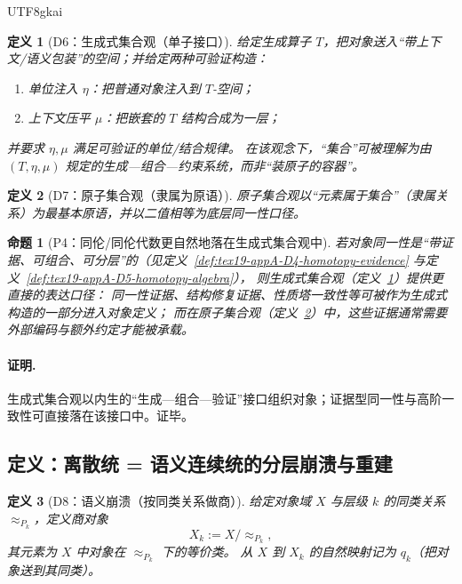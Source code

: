 \documentclass[12pt]{article}
\newtheorem{definition}{定义}[section]
\newtheorem{proposition}{命题}[section]
\begin{document}
\begin{CJK*}{UTF8}{gkai}
\begin{definition}[D6：生成式集合观（单子接口）]
\label{def:tex19-appA-D6-monad}
给定生成算子 $T$，把对象送入“带上下文/语义包装”的空间；并给定两种可验证构造：
\begin{enumerate}
  \item 单位注入 $\eta$：把普通对象注入到 $T$-空间；
  \item 上下文压平 $\mu$：把嵌套的 $T$ 结构合成为一层；
\end{enumerate}
并要求 $\eta,\mu$ 满足可验证的单位/结合规律。
在该观念下，“集合”可被理解为由 $(T,\eta,\mu)$ 规定的生成—组合—约束系统，而非“装原子的容器”。
\end{definition}

\begin{definition}[D7：原子集合观（隶属为原语）]
\label{def:tex19-appA-D7-atomic-set-view}
原子集合观以“元素属于集合”（隶属关系）为最基本原语，并以二值相等为底层同一性口径。
\end{definition}

\begin{proposition}[P4：同伦/同伦代数更自然地落在生成式集合观中]
\label{prop:tex19-appA-P4-homotopy-prefers-monad}
若对象同一性是“带证据、可组合、可分层”的（见定义~\ref{def:tex19-appA-D4-homotopy-evidence} 与定义~\ref{def:tex19-appA-D5-homotopy-algebra}），
则生成式集合观（定义~\ref{def:tex19-appA-D6-monad}）提供更直接的表达口径：
同一性证据、结构修复证据、性质塔一致性等可被作为生成式构造的一部分进入对象定义；
而在原子集合观（定义~\ref{def:tex19-appA-D7-atomic-set-view}）中，这些证据通常需要外部编码与额外约定才能被承载。
\end{proposition}

\paragraph{证明.}
生成式集合观以内生的“生成—组合—验证”接口组织对象；证据型同一性与高阶一致性可直接落在该接口中。证毕。

\subsection{定义：离散统 = 语义连续统的分层崩溃与重建}
\label{subsec:tex19-appA-discrete-tower}

\begin{definition}[D8：语义崩溃（按同类关系做商）]
\label{def:tex19-appA-D8-collapse}
给定对象域 $X$ 与层级 $k$ 的同类关系 $\approx_{P_k}$，定义商对象
\[
X_k := X/\!\approx_{P_k},
\]
其元素为 $X$ 中对象在 $\approx_{P_k}$ 下的等价类。
从 $X$ 到 $X_k$ 的自然映射记为 $q_k$（把对象送到其同类）。
\end{definition}


\end{CJK*}
\end{document}
